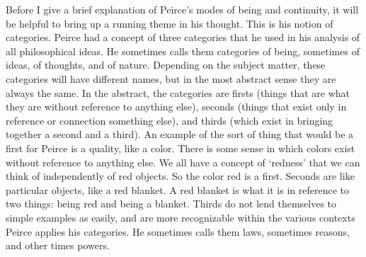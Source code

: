 \documentclass[12pt]{article}
\begin{document}
Before I give a brief explanation of Peirce's modes of being and continuity, it will be helpful to bring up a running theme in his thought. This is his notion of categories. Peirce had a concept of three categories that he used in his analysis of all philosophical ideas. He sometimes calls them categories of being, sometimes of ideas, of thoughts, and of nature. Depending on the subject matter, these categories will have different names, but in the most abstract sense they are always the same. In the abstract, the categories are firsts (things that are what they are without reference to anything else), seconds (things that exist only in reference or connection something else), and thirds (which exist in bringing together a second and a third). An example of the sort of thing that would be a first for Peirce is a quality, like a color. There is some sense in which colors exist without reference to anything else. We all have a concept of `redness' that we can think of independently of red objects. So the color red is a first. Seconds are like particular objects, like a red blanket. A red blanket is what it is in reference to two things: being red and being a blanket. Thirds do not lend themselves to simple examples as easily, and are more recognizable within the various contexts Peirce applies his categories. He sometimes calls them laws, sometimes reasons, and other times powers.
\end{document}
